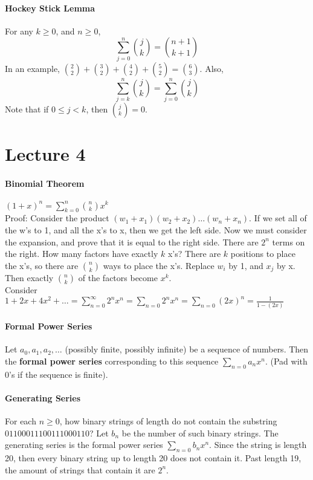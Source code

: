 \documentclass[10pt,letter]{article}
\begin{document}
\paragraph{Hockey Stick Lemma} For any $k\geq 0$, and $n\geq0$, $$\sum_{j=0}^n{j\choose k}={n+1\choose k+1}$$ In an example, ${2\choose 2}+{3\choose 2}+{4\choose 2}+{5\choose 2}={6\choose 3}$. Also, $$\sum_{j=k}^n{j\choose k}=\sum_{j=0}^n{j\choose k}$$ Note that if $0\leq j<k$, then ${j\choose k}=0$. 
    
\section*{Lecture 4}
\paragraph{Binomial Theorem} $(1+x)^n=\sum_{k=0}^n{n\choose k}x^k$ \\ 
Proof: Consider the product $(w_1+x_1)(w_2+x_2)\ldots(w_n+x_n)$. If we set all of the w's to 1, and all the x's to x, then we get the left side. Now we must consider the expansion, and prove that it is equal to the right side. There are $2^n$ terms on the right. How many factors have exactly $k$ x's? There are $k$ positions to place the x's, so there are ${n\choose k}$ ways to place the x's. Replace $w_i$ by 1, and $x_j$ by x. Then exactly ${n\choose k}$ of the factors become $x^k$.  \\ 
Consider $1+2x+4x^2+\ldots=\sum_{n=0}^\infty2^nx^n=\sum_{n=0}2^nx^n=\sum_{n=0}(2x)^n=\frac{1}{1-(2x)}$

\paragraph{Formal Power Series} Let $a_0,a_1,a_2,\ldots$ (possibly finite, possibly infinite) be a sequence of numbers. Then the \textbf{formal power series} corresponding to this sequence $\sum_{n=0}a_nx^n$. (Pad with 0's if the sequence is finite). 

\paragraph{Generating Series} For each $n\geq0$, how binary strings of length do not contain the substring $01100011100111000110$? Let $b_n$ be the number of such binary strings. The generating series is the formal power series $\sum_{n=0}b_nx^n$. Since the string is length 20, then every binary string up to length 20 does not contain it. Past length 19, the amount of strings that contain it are $2^n$. 
\end{document}
